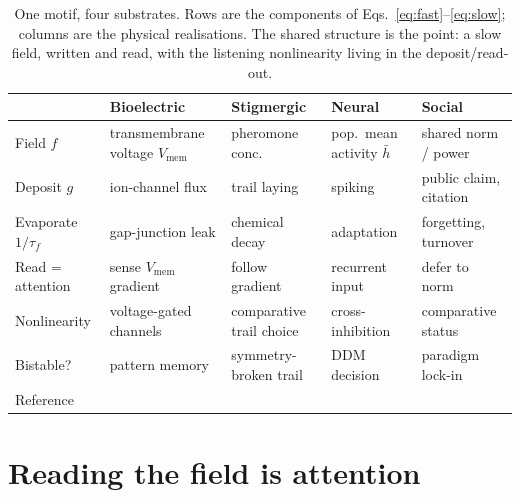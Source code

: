 \documentclass[11pt,a4paper]{article}
\theoremstyle{plain}
\begin{document}
\begin{table}[t]
\centering
\renewcommand{\arraystretch}{1.25}
\begin{tabular}{@{}p{2.5cm} p{2.4cm} p{2.6cm} p{2.6cm} p{2.5cm}@{}}
\toprule
 & \textbf{Bioelectric} & \textbf{Stigmergic} & \textbf{Neural} & \textbf{Social} \\
\midrule
Field $f$        & transmembrane voltage $V_{\mathrm{mem}}$ & pheromone conc.\ & pop.\ mean activity $\bar h$ & shared norm / power \\
Deposit $g$      & ion-channel flux & trail laying & spiking & public claim, citation \\
Evaporate $1/\tau_f$ & gap-junction leak & chemical decay & adaptation & forgetting, turnover \\
Read = attention & sense $V_{\mathrm{mem}}$ gradient & follow gradient & recurrent input & defer to norm \\
Nonlinearity     & voltage-gated channels & comparative trail choice & cross-inhibition & comparative status \\
Bistable?        & pattern memory & symmetry-broken trail & DDM decision & paradigm lock-in \\
Reference        & \cite{Levin2014,PezzuloLevin2016} & \cite{Deneubourg1990} & \cite{MarshallBogacz2009} & \cite{Flack2017,TTOM2020} \\
\bottomrule
\end{tabular}
\caption{One motif, four substrates. Rows are the components of
Eqs.~\eqref{eq:fast}--\eqref{eq:slow}; columns are the physical realisations.
The shared structure is the point: a slow field, written and read, with the
listening nonlinearity living in the deposit/read-out.}
\label{tab:substrates}
\end{table}

\section{Reading the field is attention}
\label{sec:attention}
\end{document}
